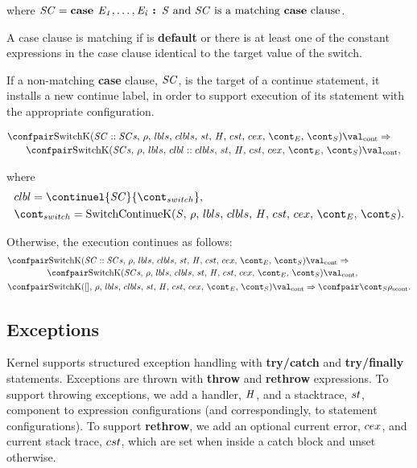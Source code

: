 \documentclass{article}
\newcommand{\cesktrans}[2]{\ensuremath{{#1} \Rightarrow {#2}}}
\newcommand{\cesktranssplit}[2]{\ensuremath{{#1} \Rightarrow\\ {#2}}}
\begin{document}
\noindent where $\mathit{SC} = \textbf{case } \mathit{E}_\mathit{1}, \dots, \mathit{E}_\mathit{i} \textbf{ : } \mathit{S} \textrm{ and } \mathit{SC} \textrm{ is a matching \textbf{case} clause}$.

A case clause is matching if is \textbf{default} or there is at least one of the constant expressions in the case clause identical to the target value of the switch.

If a non-matching \textbf{case} clause, $\mathit{SC}$, is the target of a continue statement, it installs a new continue label, in order to support execution of its statement with the appropriate configuration.

\begin{align*}
    &\begin{multlined}
        \cesktranssplit
            {\contconf{\SwitchK{\scase :: \scases}{\clbls}}{\val}}%
            {\contconf{\SwitchK{\scases}{\clbl :: \clbls}}{\val}},
    \end{multlined}
\end{align*}

\noindent where
\begin{align*}
    &\clbl = \continuel{\scase}{\switchcont},\\
    &\switchcont = \ContinueK.
\end{align*}

Otherwise, the execution continues as follows:
\begin{align*}
    &\begin{multlined}
        \cesktranssplit%
            {\contconf{\SwitchK{\scase :: \scases}{\clbls}}{\val}}%
            {\contconf{\SwitchK{\scases}{\clbls}}{\val}},
    \end{multlined}\\
    &\cesktrans%
        {\contconf{\SwitchK{[]}{\clbls}}{\val}}%
        {\scontconf{\scont}{\env}}.
\end{align*}

\subsection{Exceptions}

Kernel supports structured exception handling with \textbf{try/catch} and \textbf{try/finally} statements.
Exceptions are thrown with \textbf{throw} and \textbf{rethrow} expressions.
To support throwing exceptions, we add a handler, $\mathit{H}$, and a stacktrace, $st$, component to expression configurations (and correspondingly, to statement configurations).
To support \textbf{rethrow}, we add an optional current error, $cex$, and current stack trace, $cst$, which are set when inside a catch block and unset otherwise.
\end{document}
